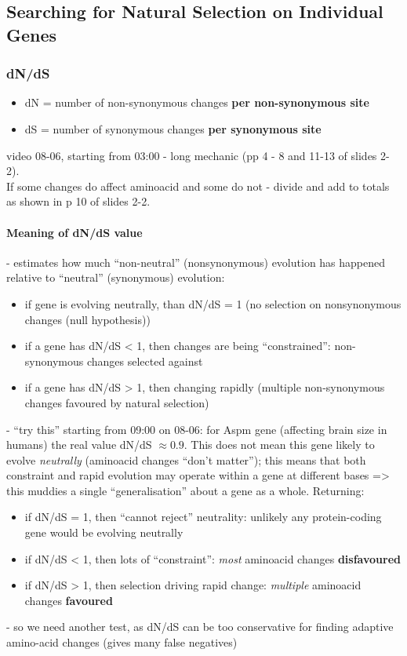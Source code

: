 \documentclass{scrartcl}
\begin{document}
\subsection{Searching for Natural Selection on Individual Genes}
\label{sec:08-06}
\subsubsection{ dN/dS}
\label{sec:08-06-1}

\begin{itemize}
\item dN = number of non-synonymous changes {\bf per non-synonymous site}
\item dS = number of synonymous changes {\bf per synonymous site}
\end{itemize}
video 08-06, starting from 03:00 - long mechanic (pp 4 - 8 and 11-13 of slides 2-2).\\
If some changes do affect aminoacid and some do not - divide and add to totals as shown in p 10 of slides 2-2.
\paragraph{Meaning of dN/dS value}

- estimates how much ``non-neutral'' (nonsynonymous) evolution has happened relative to ``neutral'' (synonymous) evolution:
\begin{itemize}
\item if gene is evolving neutrally, than dN/dS = 1 (no selection on nonsynonymous changes (null hypothesis))
\item if a gene has dN/dS < 1, then changes are being ``constrained'': non-synonymous changes selected against
\item if a gene has dN/dS > 1, then changing rapidly (multiple non-synonymous changes favoured by natural selection)
\end{itemize}
- ``try this'' starting from 09:00 on 08-06: for Aspm gene (affecting brain size in humans) the real value dN/dS $\approx 0.9$.
This does not mean this gene likely to evolve {\em neutrally} (aminoacid changes ``don't matter''); this means that both constraint and rapid evolution may operate within a gene at different bases => this muddies a single ``generalisation'' about a gene as a whole.
Returning:
\begin{itemize}
\item if dN/dS = 1, then ``cannot reject'' neutrality: unlikely any protein-coding gene would be evolving neutrally
\item if dN/dS < 1, then lots of ``constraint'': {\em most} aminoacid changes {\bf disfavoured}
\item if dN/dS > 1, then selection driving rapid change: {\em multiple } aminoacid changes {\bf favoured}
\end{itemize}
- so we need another test, as dN/dS can be too conservative for finding adaptive amino-acid changes (gives many false negatives)
\end{document}
